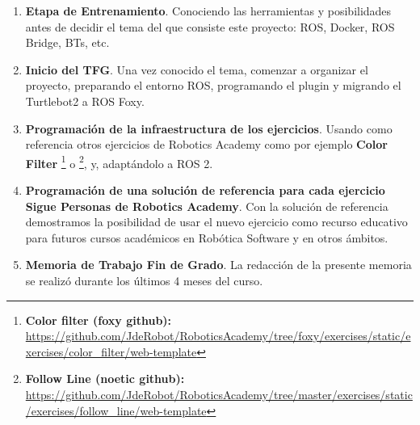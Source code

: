 \begin{enumerate}
	\item \textbf{Etapa de Entrenamiento}. Conociendo las herramientas y posibilidades antes de decidir el tema del que consiste este proyecto: ROS, Docker, ROS Bridge, BTs, etc.
	\item \textbf{Inicio del TFG}. Una vez conocido el tema, comenzar a organizar el proyecto, preparando el entorno ROS, programando el plugin y migrando el Turtlebot2 a ROS Foxy.
	\item \textbf{Programación de la infraestructura de los ejercicios}. Usando como referencia otros ejercicios de Robotics Academy como por ejemplo \textbf{Color Filter} \footnote{\textbf{Color filter (foxy github):} \url{https://github.com/JdeRobot/RoboticsAcademy/tree/foxy/exercises/static/exercises/color_filter/web-template}} o \footnote{\textbf{Follow Line (noetic github):} \url{https://github.com/JdeRobot/RoboticsAcademy/tree/master/exercises/static/exercises/follow_line/web-template}}, y, adaptándolo a ROS 2.
	\item \textbf{Programación de una solución de referencia para cada ejercicio Sigue Personas de Robotics Academy}. Con la solución de referencia demostramos la posibilidad de usar el nuevo ejercicio como recurso educativo para futuros cursos académicos en Robótica Software y en otros ámbitos.
	\item \textbf{Memoria de Trabajo Fin de Grado}. La redacción de la presente memoria se realizó durante los últimos 4 meses del curso. 
\end{enumerate}


